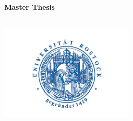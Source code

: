 \thispagestyle{empty}
\begin{titlepage}

  \condTWOSIDE{\changetext{}{19mm}{}{19mm}{}}

  \begin{center}
  	
  	\LARGE \textbf{\myTitle}   \\
  	\vspace{0.5cm}
  	
  	\Large \textbf{Master Thesis} \\
  	\vspace{0.8cm}
  \end{center} 
  
  
\begin{center}
	
	\huge \textbf{\myUni}\\   
	
	\includegraphics[width=6.5cm]{4.graphics/logo/uni_rostock_logo} \\ 
	
	\Large \myFaculty       %
	
	\vspace{0.3cm}
\end{center}



  \condTWOSIDE{\changetext{}{-19mm}{}{-19mm}{}}

\end{titlepage}
